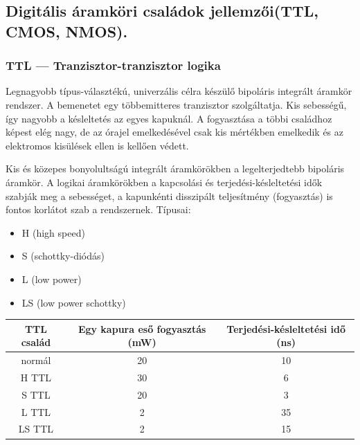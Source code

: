 \subsection{Digitális áramköri családok jellemzői(TTL, CMOS, NMOS).}
\subsubsection{TTL --- Tranzisztor-tranzisztor logika}
Legnagyobb típus-választékú, univerzális célra készülő bipoláris integrált áramkör rendszer. A bemenetet egy többemitteres tranzisztor szolgáltatja. Kis sebességű, így nagyobb a késleltetés az egyes kapuknál. A fogyasztása a többi családhoz képest elég nagy, de az órajel emelkedésével csak kis mértékben emelkedik és az elektromos kisülések ellen is kellően védett. 

Kis és közepes bonyolultságú integrált áramkörökben a legelterjedtebb bipoláris áramkör. A logikai áramkörökben a kapcsolási és terjedési-késleltetési idők szabják meg a sebességet, a kapunkénti disszipált teljesítmény (fogyasztás) is fontos korlátot szab a rendszernek.
Típusai:
\begin{itemize}[nosep]
	\item H (high speed)
	\item S (schottky-diódás)
	\item L (low power)
	\item LS (low power schottky)
\end{itemize}
\begin{tabular}{|c|c|c|}
	\hline 
	TTL család & Egy kapura eső fogyasztás (mW) & Terjedési-késleltetési idő (ns) \\ 
	\hline 
	normál & 20 & 10 \\ 
	\hline 
	H TTL & 30 & 6 \\ 
	\hline 
	S TTL & 20 & 3 \\ 
	\hline 
	L TTL & 2 & 35 \\ 
	\hline 
	LS TTL & 2 & 15 \\ 
	\hline 
\end{tabular} 
